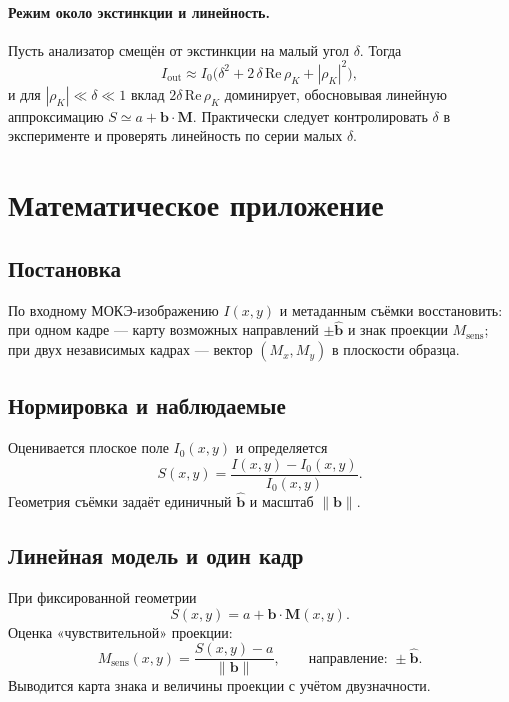 \documentclass[12pt,a4paper]{article}
\numberwithin{equation}{section}
\begin{document}
\paragraph{Режим около экстинкции и линейность.}
Пусть анализатор смещён от экстинкции на малый угол \(\delta\). Тогда
\begin{equation}
 I_{\text{out}} \approx I_0\Big(\delta^2 + 2\,\delta\,\mathrm{Re}\,\rho_K + |\rho_K|^2\Big),
\end{equation}
и для \(|\rho_K| \ll \delta \ll 1\) вклад \(2\delta\,\mathrm{Re}\,\rho_K\) доминирует, обосновывая линейную аппроксимацию \(S\simeq a+\mathbf b\cdot\mathbf M\). Практически следует контролировать \(\delta\) в эксперименте и проверять линейность по серии малых \(\delta\).

\section{Математическое приложение}
\subsection{Постановка}
По входному МОКЭ-изображению \(I(x,y)\) и метаданным съёмки восстановить: при одном кадре — карту возможных направлений \(\pm\hat{\mathbf b}\) и знак проекции \(M_{\text{sens}}\); при двух независимых кадрах — вектор \((M_x,M_y)\) в плоскости образца.

\subsection{Нормировка и наблюдаемые}
Оценивается плоское поле \(I_0(x,y)\) и определяется
\begin{equation}
 S(x,y)=\frac{I(x,y)-I_0(x,y)}{I_0(x,y)}.
\end{equation}
Геометрия съёмки задаёт единичный \(\hat{\mathbf b}\) и масштаб \(\|\mathbf b\|\).

\subsection{Линейная модель и один кадр}
При фиксированной геометрии
\begin{equation}
 S(x,y)=a+\mathbf b\cdot \mathbf M(x,y).
\end{equation}
Оценка «чувствительной» проекции:
\begin{equation}
 M_{\text{sens}}(x,y)=\frac{S(x,y)-a}{\|\mathbf b\|}, \qquad \text{направление: } \pm \hat{\mathbf b}.
\end{equation}
Выводится карта знака и величины проекции с учётом двузначности.
\end{document}
